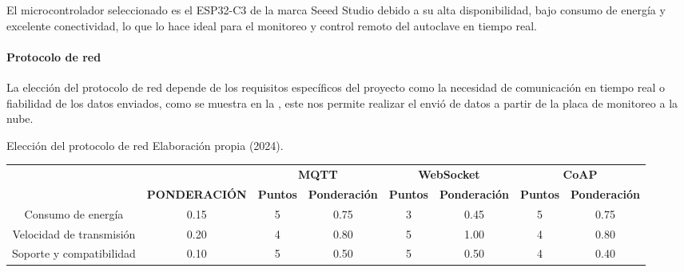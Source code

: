 El microcontrolador seleccionado es el ESP32-C3 de la marca Seeed Studio debido a su alta disponibilidad, bajo consumo de energía y excelente conectividad, lo que lo hace ideal para el monitoreo y control remoto del autoclave en tiempo real.

\paragraph{Protocolo de red}
La elección del protocolo de red depende de los requisitos específicos del proyecto como la necesidad de comunicación en tiempo real o fiabilidad de los datos enviados, como se muestra en la , este nos permite realizar el envió de datos a partir de la placa de monitoreo a la nube.

\begin{tabla}[red]  
{Elección del protocolo de red}
{Elaboración propia (2024).}
\centering
\resizebox{15cm}{!} 
{
\begin{tabular}{|c|c|c|c|c|c|c|c|} 
\hline
\rowcolor[rgb]{0.678,0.702,0.698} {\cellcolor[rgb]{0.678,0.702,0.698}}                                    & {\cellcolor[rgb]{0.678,0.702,0.698}}                                       & \multicolumn{2}{c|}{\textbf{MQTT}}     & \multicolumn{2}{c|}{\textbf{WebSocket}} & \multicolumn{2}{c|}{\textbf{CoAP}}      \\
\rowcolor[rgb]{0.678,0.702,0.698} \multirow{-2}{*}{{\cellcolor[rgb]{0.678,0.702,0.698}}\textbf{CRITERIO}} & \multirow{-2}{*}{{\cellcolor[rgb]{0.678,0.702,0.698}}\textbf{PONDERACIÓN}} & \textbf{Puntos} & \textbf{Ponderación} & \textbf{Puntos} & \textbf{Ponderación}  & \textbf{Puntos} & \textbf{Ponderación}  \\ 
\hline
Consumo de energía                                                                                        & 0.15                                                                       & 5               & 0.75                 & 3               & 0.45                  & 5               & 0.75                  \\ 
\hline
\rowcolor[rgb]{0.027,0.894,0.675} Velocidad de transmisión                                                & 0.20                                                                       & 4               & 0.80                 & 5               & 1.00                  & 4               & 0.80                  \\ 
\hline
Soporte y compatibilidad                                                                                  & 0.10                                                                       & 5               & 0.50                 & 5               & 0.50                  & 4               & 0.40                  \\ 

\end{tabular}}
\end{tabla}
